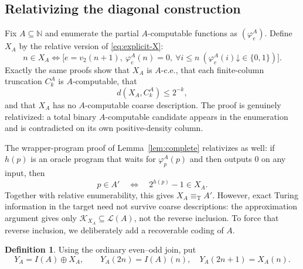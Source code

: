 \documentclass[11pt,a4paper]{article}
\newcommand{\N}{\mathbb N}
\newcommand{\eqT}{\equiv_{\mathrm T}}
\newcommand{\Core}[1]{\mathcal K_{#1}}
\newcommand{\Low}[1]{\mathcal L(#1)}
\newcommand{\down}{\mathord{\downarrow}}
\theoremstyle{definition}\newtheorem{definition}[theorem]{Definition}
\theoremstyle{remark}\newtheorem{remark}[theorem]{Remark}
\begin{document}
\subsection{Relativizing the diagonal construction}
Fix $A\subseteq\N$ and enumerate the partial $A$-computable functions as $(\varphi_e^A)$. Define $X_A$ by the relative version of \eqref{eq:explicit-X}:
\begin{equation}\label{eq:relative-X}
 n\in X_A\iff
 \bigl[e=v_2(n+1),\ \varphi_e^A(n)=0,
 \ \forall i\le n\ (\varphi_e^A(i)\down\in\{0,1\})\bigr].
\end{equation}
Exactly the same proofs show that $X_A$ is $A$-c.e., that each finite-column truncation $C_k^A$ is $A$-computable, that
\begin{equation}\label{eq:relative-approx}
                 d(X_A,C_k^A)\le2^{-k},
\end{equation}
and that $X_A$ has no $A$-computable coarse description. The proof is genuinely relativized: a total binary $A$-computable candidate appears in the enumeration and is contradicted on its own positive-density column.

The wrapper-program proof of Lemma~\ref{lem:complete} relativizes as well: if $h(p)$ is an oracle program that waits for $\varphi_p^A(p)$ and then outputs $0$ on any input, then
\[
 p\in A'\quad\Longleftrightarrow\quad 2^{h(p)}-1\in X_A.
\]
Together with relative enumerability, this gives $X_A\eqT A'$. However, exact Turing information in the target need not survive coarse descriptions: the approximation argument gives only $\Core{X_A}\subseteq\Low A$, not the reverse inclusion. To force that reverse inclusion, we deliberately add a recoverable coding of $A$.

\begin{definition}
Using the ordinary even--odd join, put
\begin{equation}\label{eq:relative-Y}
 Y_A=I(A)\oplus X_A,
 \qquad Y_A(2n)=I(A)(n),\quad Y_A(2n+1)=X_A(n).
\end{equation}
\end{definition}
\end{document}
